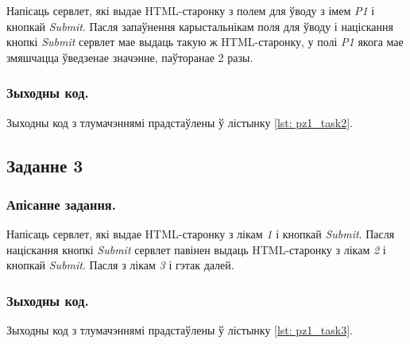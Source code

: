 Напісаць сервлет, які выдае HTML-старонку з полем для ўводу з імем
\textit{P1} і кнопкай \textit{Submit}. Пасля запаўнення карыстальнікам
поля для ўводу і націскання кнопкі \textit{Submit} сервлет мае выдаць
такую ж HTML-старонку, у полі \textit{P1} якога мае змяшчацца
ўведзенае значэнне, паўторанае 2 разы.

\subsubsection{Зыходны код.}

Зыходны код з тлумачэннямі прадстаўлены
ў лістынку \ref{lst: pz1_task2}.



\vspace{-\baselineskip}
\subsection{Заданне 3}

\subsubsection{Апісанне задання.}

Напісаць сервлет, які выдае HTML-старонку з лікам \textit{1} і
кнопкай \textit{Submit}. Пасля націскання кнопкі \textit{Submit}
сервлет павінен выдаць HTML-старонку з лікам \textit{2} і кнопкай
\textit{Submit}. Пасля з лікам \textit{3} і гэтак далей.

\subsubsection{Зыходны код.}

Зыходны код з тлумачэннямі прадстаўлены
ў лістынку \ref{lst: pz1_task3}.


